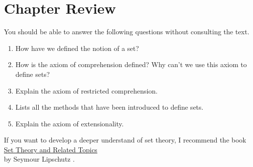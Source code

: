 \section{Chapter Review}
You should be able to answer the following questions without consulting the text.
\begin{enumerate}
\item How have we defined the notion of a set?
\item How is the axiom of comprehension defined?  Why can't we use this axiom to define sets?
\item Explain the axiom of restricted comprehension.
\item Lists all the methods that have been introduced to define sets.
\item Explain the axiom of extensionality.
\end{enumerate}
If you want to develop a deeper understand of set theory, I recommend the book
\\[0.2cm]
\hspace*{1.3cm}
\href{http://www.google.com/search?q=Set+Theory+and+Related+Topics+pdf}{Set Theory and Related Topics} 
\\[0.2cm]
by Seymour Lipschutz \cite{lipschutz:1998}.

